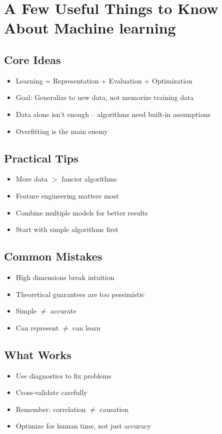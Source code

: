 \documentclass[12pt]{article}
\begin{document}
\newpage
\thispagestyle{empty}

\section*{A Few Useful Things to Know About Machine learning}

\subsection*{Core Ideas}
\begin{itemize}
\item Learning = Representation + Evaluation + Optimization
\item Goal: Generalize to new data, not memorize training data
\item Data alone isn't enough -- algorithms need built-in assumptions
\item Overfitting is the main enemy
\end{itemize}

\subsection*{Practical Tips}
\begin{itemize}
\item More data $>$ fancier algorithms
\item Feature engineering matters most
\item Combine multiple models for better results
\item Start with simple algorithms first
\end{itemize}

\subsection*{Common Mistakes}
\begin{itemize}
\item High dimensions break intuition
\item Theoretical guarantees are too pessimistic
\item Simple $\neq$ accurate
\item Can represent $\neq$ can learn
\end{itemize}

\subsection*{What Works}
\begin{itemize}
\item Use diagnostics to fix problems
\item Cross-validate carefully
\item Remember: correlation $\neq$ causation
\item Optimize for human time, not just accuracy
\end{itemize}
\end{document}
